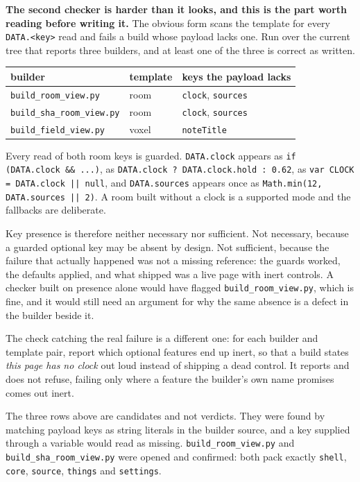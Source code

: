 \textbf{The second checker is harder than it looks, and this is the part worth reading before writing it.} The obvious form scans the template for every \texttt{DATA.<key>} read and fails a build whose payload lacks one. Run over the current tree that reports three builders, and at least one of the three is correct as written.

\begin{center}
\begin{tabular}{@{}lll@{}}
\toprule
builder & template & keys the payload lacks \\
\midrule
\texttt{build\_room\_view.py} & room & \texttt{clock}, \texttt{sources} \\
\texttt{build\_sha\_room\_view.py} & room & \texttt{clock}, \texttt{sources} \\
\texttt{build\_field\_view.py} & voxel & \texttt{noteTitle} \\
\bottomrule
\end{tabular}
\end{center}

Every read of both room keys is guarded. \texttt{DATA.clock} appears as \texttt{if (DATA.clock \&\& ...)}, as \texttt{DATA.clock ? DATA.clock.hold : 0.62}, as \texttt{var CLOCK = DATA.clock || null}, and \texttt{DATA.sources} appears once as \texttt{Math.min(12, DATA.sources || 2)}. A room built without a clock is a supported mode and the fallbacks are deliberate.

Key presence is therefore neither necessary nor sufficient. Not necessary, because a guarded optional key may be absent by design. Not sufficient, because the failure that actually happened was not a missing reference: the guards worked, the defaults applied, and what shipped was a live page with inert controls. A checker built on presence alone would have flagged \texttt{build\_room\_view.py}, which is fine, and it would still need an argument for why the same absence is a defect in the builder beside it.

The check catching the real failure is a different one: for each builder and template pair, report which optional features end up inert, so that a build states \emph{this page has no clock} out loud instead of shipping a dead control. It reports and does not refuse, failing only where a feature the builder's own name promises comes out inert.

The three rows above are candidates and not verdicts. They were found by matching payload keys as string literals in the builder source, and a key supplied through a variable would read as missing. \texttt{build\_room\_view.py} and \texttt{build\_sha\_room\_view.py} were opened and confirmed: both pack exactly \texttt{shell}, \texttt{core}, \texttt{source}, \texttt{things} and \texttt{settings}.

